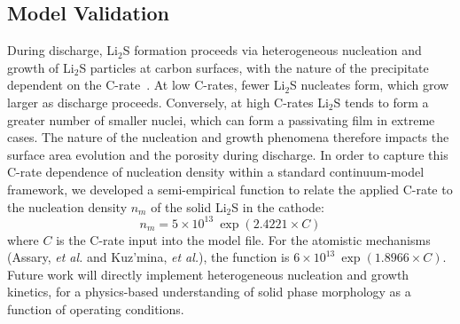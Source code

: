 \documentclass{elsarticle}
\begin{document}
\subsection{Model Validation}
During discharge, Li$_2$S formation proceeds via heterogeneous nucleation and growth of Li$_2$S particles at carbon surfaces, with the nature of the precipitate dependent on the C-rate~\cite{REN2016115}. At low C-rates, fewer Li$_2$S nucleates form, which grow larger as discharge proceeds. Conversely, at high C-rates Li$_2$S tends to form a greater number of smaller nuclei, which can form a passivating film in extreme cases. The nature of the nucleation and growth phenomena therefore impacts the surface area evolution and the porosity during discharge. In order to capture this C-rate dependence of nucleation density within a standard continuum-model framework, we developed a semi-empirical function to relate the applied C-rate to the nucleation density $n_m$ of the solid Li$_2$S in the cathode:
\begin{equation}\label{eq:li2s_nucl}
    n_m = 5 \times 10^{13} ~ \exp \left( 2.4221 \times C \right)
\end{equation}
where $C$ is the C-rate input into the model file. For the atomistic mechanisms (Assary, \textit{et al.} and Kuz'mina, \textit{et al.}), the function is $6 \times 10^{13} ~ \exp \left( 1.8966 \times C \right)$. Future work will directly implement heterogeneous nucleation and growth kinetics, for a physics-based understanding of solid phase morphology as a function of operating conditions. 
\end{document}
